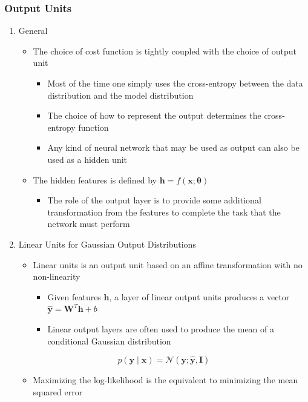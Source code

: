 \documentclass[11pt]{article}
\begin{document}
\subsubsection{Output Units}
\label{sec:org6b57cbe}
\begin{enumerate}
\item General
\label{sec:orgc939eac}
\begin{itemize}
\item The choice of cost function is tightly coupled with the choice of output unit
\begin{itemize}
\item Most of the time one simply uses the cross-entropy between the data distribution and the model distribution
\item The choice of how to represent the output determines the cross-entropy function
\item Any kind of neural network that may be used as output can also be used as a hidden unit
\end{itemize}

\item The hidden features is defined by \(\pmb h = f(\pmb x ; \pmb \theta)\)
\begin{itemize}
\item The role of the output layer is to provide some additional transformation from the features to complete the task that the network must perform
\end{itemize}
\end{itemize}

\item Linear Units for Gaussian Output Distributions
\label{sec:org672659c}
\begin{itemize}
\item Linear units is an output unit based on an affine transformation with no non-linearity
\begin{itemize}
\item Given features \(\pmb h\), a layer of linear output units produces a vector \(\hat{\pmb y}= \pmb W^T \pmb h + b\)
\item Linear output layers are often used to produce the mean of a conditional Gaussian distribution
\end{itemize}
\end{itemize}
\begin{equation}
  p(\pmb y \mid \pmb x) = \mathcal N(\pmb y; \hat{\pmb y}, \pmb I)
\end{equation}
\begin{itemize}
\item Maximizing the log-likelihood is the equivalent to minimizing the mean squared error
\end{itemize}
\end{enumerate}
\end{document}

